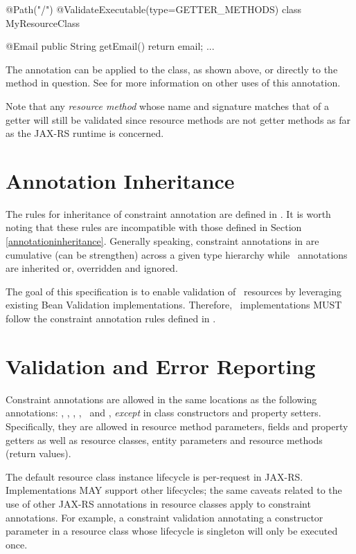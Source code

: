 \begin{listing}{1}
@Path("/")
@ValidateExecutable(type=GETTER_METHODS)
class MyResourceClass {

  @Email
  public String getEmail() {
    return email;
  }
  ...
}
\end{listing}

The annotation  can be applied to the class, as shown above, or directly to the method in question. See \cite{bv11} for more information on other uses of this annotation.

Note that any {\em resource method} whose name and signature matches that of a getter will still be validated since resource methods are not getter methods as far as the JAX-RS runtime is concerned.

\section{Annotation Inheritance}
\label{annotation_inheritance}

The rules for inheritance of constraint annotation are defined in \cite{bv11}. It is worth noting that these rules are incompatible with those defined in Section \ref{annotationinheritance}. Generally speaking, constraint annotations in \cite{bv11} are cumulative (can be strengthen) across a given type hierarchy while \jaxrs\ annotations are inherited or, overridden and ignored.

The goal of this specification is to enable validation of \jaxrs\ resources by leveraging existing Bean Validation implementations. Therefore, \jaxrs\ implementations MUST follow the constraint annotation rules defined in \cite{bv11}.

\section{Validation and Error Reporting}
\label{validation_and_error_reporting}

Constraint annotations are allowed in the same locations as the following annotations: \MatrixParam, \QueryParam, \PathParam, \CookieParam, \HeaderParam\ and \Context, {\em except} in class constructors and property setters. Specifically, they are allowed in resource method parameters, fields and property getters as well as resource classes, entity parameters and resource methods (return values). 

The default resource class instance lifecycle is per-request in JAX-RS. Implementations MAY support other lifecycles; the same caveats related to the use of other JAX-RS annotations in resource classes apply to constraint annotations. For example, a constraint validation annotating a constructor parameter in a resource class whose lifecycle is singleton will only be executed once.

